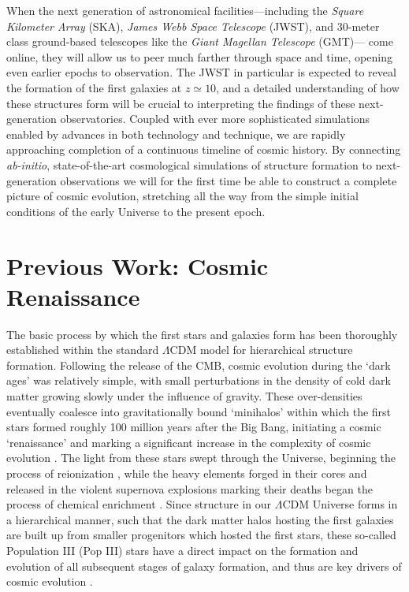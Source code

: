 \documentclass[../thesis.tex]{subfiles}
\begin{document}
When the next generation of astronomical facilities---including the \textit{Square Kilometer Array} (SKA), \textit{James Webb Space Telescope} (JWST), and 30-meter class ground-based telescopes like the \textit{Giant Magellan Telescope} (GMT)--- come online, they will allow us to peer much farther through space and time, opening even earlier epochs to observation.
The JWST in particular is expected to reveal the formation of the first galaxies at $z\simeq10$, and a detailed understanding of how these structures form will be crucial to interpreting the findings of these next-generation observatories.
Coupled with ever more sophisticated simulations enabled by advances in both technology and technique, we are rapidly approaching completion of a continuous timeline of cosmic history. 
By connecting \textit{ab-initio}, state-of-the-art cosmological simulations of structure formation to next-generation observations we will for the first time be able to construct a complete picture of cosmic evolution, stretching all the way from the simple initial conditions of the early Universe to the present epoch.

\section{Previous Work: Cosmic Renaissance}
The basic process by which the first stars and galaxies form has been thoroughly established within the standard $\Lambda$CDM model for hierarchical structure formation.
Following the release of the CMB, cosmic evolution during the `dark ages' was relatively simple, with small perturbations in the density of cold dark matter 
growing slowly under the influence of gravity.
These over-densities eventually coalesce into gravitationally bound `minihalos' within which the first stars formed roughly 100 million years after the Big Bang, initiating a cosmic `renaissance' and marking a significant increase in the complexity of cosmic evolution \citep{BarkanaLoeb2001, Miralda-Escude2003, Brommetal2009, Loeb2010}.
The light from these stars swept through the Universe, beginning the process of reionization \citep[e.g.,][]{Meiksin2009}, while the heavy elements forged in their cores and released in the violent supernova explosions marking their deaths began the process of chemical enrichment \citep[e.g.,][]{KarlssonBrommHawthorn2013}.
Since structure in our $\Lambda$CDM Universe forms in a hierarchical manner, such that the dark matter halos hosting the first galaxies are built up from smaller progenitors which hosted the first stars, these so-called Population III (Pop III) stars have a direct impact on the formation and evolution of all subsequent stages of galaxy formation, and thus are key drivers of cosmic evolution \citep{Bromm2013}.  
\end{document}
